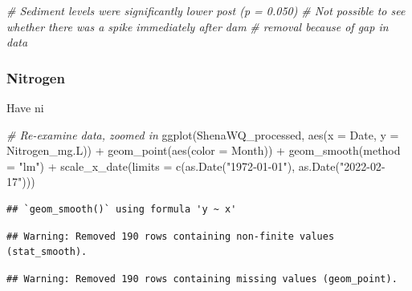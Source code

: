 \documentclass[
  12pt,
]{article}
\newenvironment{Shaded}{\begin{snugshade}}{\end{snugshade}}
\newcommand{\AttributeTok}[1]{\textcolor[rgb]{0.77,0.63,0.00}{#1}}
\newcommand{\CommentTok}[1]{\textcolor[rgb]{0.56,0.35,0.01}{\textit{#1}}}
\newcommand{\FunctionTok}[1]{\textcolor[rgb]{0.00,0.00,0.00}{#1}}
\newcommand{\NormalTok}[1]{#1}
\newcommand{\SpecialCharTok}[1]{\textcolor[rgb]{0.00,0.00,0.00}{#1}}
\newcommand{\StringTok}[1]{\textcolor[rgb]{0.31,0.60,0.02}{#1}}
\begin{document}
\begin{Shaded}
\begin{Highlighting}[]
\CommentTok{\# Sediment levels were significantly lower post (p = 0.050)}
\CommentTok{\# Not possible to see whether there was a spike immediately after dam }
\CommentTok{\# removal because of gap in data}
\end{Highlighting}
\end{Shaded}

\newpage

\hypertarget{nitrogen}{%
\subsubsection{Nitrogen}\label{nitrogen}}

Have ni

\begin{Shaded}
\begin{Highlighting}[]
\CommentTok{\# Re{-}examine data, zoomed in}
\FunctionTok{ggplot}\NormalTok{(ShenaWQ\_processed, }\FunctionTok{aes}\NormalTok{(}\AttributeTok{x =}\NormalTok{ Date, }\AttributeTok{y =}\NormalTok{ Nitrogen\_mg.L)) }\SpecialCharTok{+}
  \FunctionTok{geom\_point}\NormalTok{(}\FunctionTok{aes}\NormalTok{(}\AttributeTok{color =}\NormalTok{ Month)) }\SpecialCharTok{+}
  \FunctionTok{geom\_smooth}\NormalTok{(}\AttributeTok{method =} \StringTok{"lm"}\NormalTok{) }\SpecialCharTok{+}
  \FunctionTok{scale\_x\_date}\NormalTok{(}\AttributeTok{limits =} \FunctionTok{c}\NormalTok{(}\FunctionTok{as.Date}\NormalTok{(}\StringTok{"1972{-}01{-}01"}\NormalTok{), }
                          \FunctionTok{as.Date}\NormalTok{(}\StringTok{"2022{-}02{-}17"}\NormalTok{)))}
\end{Highlighting}
\end{Shaded}

\begin{verbatim}
## `geom_smooth()` using formula 'y ~ x'
\end{verbatim}

\begin{verbatim}
## Warning: Removed 190 rows containing non-finite values (stat_smooth).
\end{verbatim}

\begin{verbatim}
## Warning: Removed 190 rows containing missing values (geom_point).
\end{verbatim}
\end{document}
